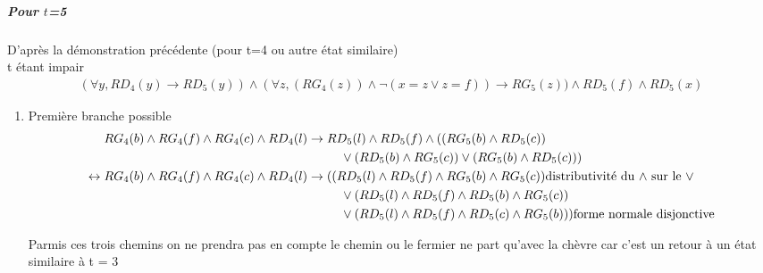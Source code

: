 \documentclass{article}
\begin{document}
\subparagraph*{Pour $t$=5}
D'après la démonstration précédente (pour t=4 ou autre état similaire)\\
t étant impair
\begin{align*}
    (\forall y, RD_{4}(y) \to RD_{5}(y)) \wedge (\forall z,(RG_{4}(z)) \wedge \neg(x=z \vee z=f)) \rightarrow RG_5(z)) \wedge RD_5(f) \wedge RD_5(x)
\end{align*}
\begin{enumerate}
\item Première branche possible
  \begin{align*}
        RG_4(b) \wedge RG_4(f) \wedge RG_4(c) \wedge RD_4(l)&\to RD_5(l) \wedge RD_5(f) \wedge ((RG_5(b)\wedge RD_5(c))\\
        & \hphantom{aaaaa} \vee (RD_5(b)\wedge RG_5(c)) \vee(RG_5(b)\wedge RD_5(c)))\\
        \leftrightarrow RG_4(b) \wedge RG_4(f) \wedge RG_4(c) \wedge RD_4(l) &\to (( RD_5(l) \wedge RD_5(f) \wedge RG_5(b) \wedge RG_5(c))\text{distributivité du $\wedge$ sur le $\vee$}\\
        & \hphantom{aaaaa} \vee (RD_5(l) \wedge RD_5(f) \wedge RD_5(b) \wedge RG_5(c))\\
        & \hphantom{aaaaa} \vee (RD_5(l) \wedge RD_5(f) \wedge RD_5(c) \wedge RG_5(b)))\text{forme normale disjonctive}\\
  \end{align*}


Parmis ces trois chemins on ne prendra pas en compte le chemin ou le fermier ne part qu'avec la chèvre car c'est un retour à un état similaire à t = 3


\end{enumerate}
\end{document}

